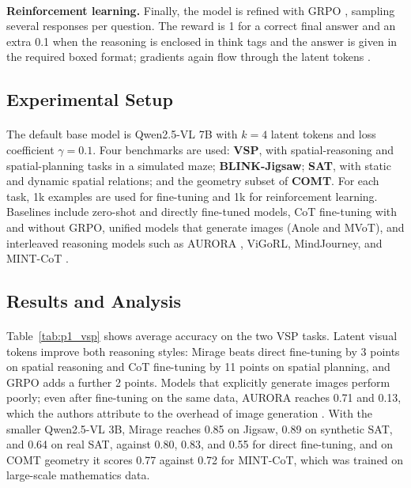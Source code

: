 \documentclass[12pt,a4paper,final]{extreport}
\begin{document}
\paragraph{} \textbf{Reinforcement learning.} Finally, the model is refined with GRPO \cite{shao2024}, sampling several responses per question. The reward is 1 for a correct final answer and an extra 0.1 when the reasoning is enclosed in think tags and the answer is given in the required boxed format; gradients again flow through the latent tokens \cite{p1}.

\subsection{Experimental Setup}

\paragraph{} The default base model is Qwen2.5-VL 7B with $k=4$ latent tokens and loss coefficient $\gamma=0.1$. Four benchmarks are used: \textbf{VSP}, with spatial-reasoning and spatial-planning tasks in a simulated maze; \textbf{BLINK-Jigsaw}; \textbf{SAT}, with static and dynamic spatial relations; and the geometry subset of \textbf{COMT}. For each task, 1k examples are used for fine-tuning and 1k for reinforcement learning. Baselines include zero-shot and directly fine-tuned models, CoT fine-tuning with and without GRPO, unified models that generate images (Anole and MVoT), and interleaved reasoning models such as AURORA \cite{p2}, ViGoRL, MindJourney, and MINT-CoT \cite{p1}.

\subsection{Results and Analysis}

\paragraph{} Table~\ref{tab:p1_vsp} shows average accuracy on the two VSP tasks. Latent visual tokens improve both reasoning styles: Mirage beats direct fine-tuning by 3 points on spatial reasoning and CoT fine-tuning by 11 points on spatial planning, and GRPO adds a further 2 points. Models that explicitly generate images perform poorly; even after fine-tuning on the same data, AURORA reaches 0.71 and 0.13, which the authors attribute to the overhead of image generation \cite{p1}. With the smaller Qwen2.5-VL 3B, Mirage reaches 0.85 on Jigsaw, 0.89 on synthetic SAT, and 0.64 on real SAT, against 0.80, 0.83, and 0.55 for direct fine-tuning, and on COMT geometry it scores 0.77 against 0.72 for MINT-CoT, which was trained on large-scale mathematics data.
\end{document}
